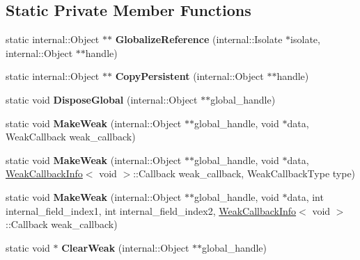 \subsection*{Static Private Member Functions}
\begin{DoxyCompactItemize}
\item 
static internal\+::\+Object $\ast$$\ast$ {\bfseries Globalize\+Reference} (internal\+::\+Isolate $\ast$isolate, internal\+::\+Object $\ast$$\ast$handle)\hypertarget{classv8_1_1_v8_ac60fa49268ca1d24624894c05b8fa740}{}\label{classv8_1_1_v8_ac60fa49268ca1d24624894c05b8fa740}

\item 
static internal\+::\+Object $\ast$$\ast$ {\bfseries Copy\+Persistent} (internal\+::\+Object $\ast$$\ast$handle)\hypertarget{classv8_1_1_v8_abae1843d8c19d70a533256d044dab99b}{}\label{classv8_1_1_v8_abae1843d8c19d70a533256d044dab99b}

\item 
static void {\bfseries Dispose\+Global} (internal\+::\+Object $\ast$$\ast$global\+\_\+handle)\hypertarget{classv8_1_1_v8_a493e47f168b2cb238684380d9e688f57}{}\label{classv8_1_1_v8_a493e47f168b2cb238684380d9e688f57}

\item 
static void {\bfseries Make\+Weak} (internal\+::\+Object $\ast$$\ast$global\+\_\+handle, void $\ast$data, Weak\+Callback weak\+\_\+callback)\hypertarget{classv8_1_1_v8_a4e629eee77f1834354b5ef10593aa7eb}{}\label{classv8_1_1_v8_a4e629eee77f1834354b5ef10593aa7eb}

\item 
static void {\bfseries Make\+Weak} (internal\+::\+Object $\ast$$\ast$global\+\_\+handle, void $\ast$data, \hyperlink{classv8_1_1_weak_callback_info}{Weak\+Callback\+Info}$<$ void $>$\+::Callback weak\+\_\+callback, Weak\+Callback\+Type type)\hypertarget{classv8_1_1_v8_a5742f2f15cf21781db9f8beac2bde3dc}{}\label{classv8_1_1_v8_a5742f2f15cf21781db9f8beac2bde3dc}

\item 
static void {\bfseries Make\+Weak} (internal\+::\+Object $\ast$$\ast$global\+\_\+handle, void $\ast$data, int internal\+\_\+field\+\_\+index1, int internal\+\_\+field\+\_\+index2, \hyperlink{classv8_1_1_weak_callback_info}{Weak\+Callback\+Info}$<$ void $>$\+::Callback weak\+\_\+callback)\hypertarget{classv8_1_1_v8_a785ed1644a48304c09a0a55a3f4c01cd}{}\label{classv8_1_1_v8_a785ed1644a48304c09a0a55a3f4c01cd}

\item 
static void $\ast$ {\bfseries Clear\+Weak} (internal\+::\+Object $\ast$$\ast$global\+\_\+handle)\hypertarget{classv8_1_1_v8_afbf11ec5a476eb000cd082acfaee04ab}{}\label{classv8_1_1_v8_afbf11ec5a476eb000cd082acfaee04ab}


\end{DoxyCompactItemize}
